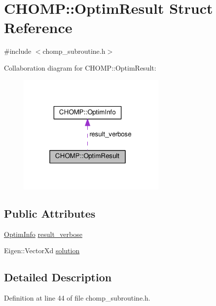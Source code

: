 \hypertarget{struct_c_h_o_m_p_1_1_optim_result}{}\section{C\+H\+O\+MP\+:\+:Optim\+Result Struct Reference}
\label{struct_c_h_o_m_p_1_1_optim_result}


{\ttfamily \#include $<$chomp\+\_\+subroutine.\+h$>$}



Collaboration diagram for C\+H\+O\+MP\+:\+:Optim\+Result\+:\nopagebreak
\begin{figure}[H]
\begin{center}
\leavevmode
\includegraphics[width=205pt]{struct_c_h_o_m_p_1_1_optim_result__coll__graph}
\end{center}
\end{figure}
\subsection*{Public Attributes}
\begin{DoxyCompactItemize}
\item 
\hyperlink{struct_c_h_o_m_p_1_1_optim_info}{Optim\+Info} \hyperlink{struct_c_h_o_m_p_1_1_optim_result_aa4314b8ae0ca38f9bad7fd8c7e1f9492}{result\+\_\+verbose}
\item 
Eigen\+::\+Vector\+Xd \hyperlink{struct_c_h_o_m_p_1_1_optim_result_ae85f14f34c231bb2f5767553b6771f9c}{solution}
\end{DoxyCompactItemize}


\subsection{Detailed Description}


Definition at line 44 of file chomp\+\_\+subroutine.\+h.



